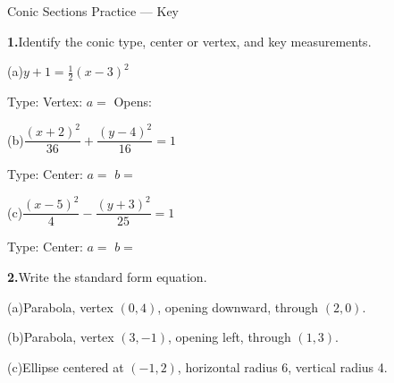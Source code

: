 \documentclass[10pt]{article}
\begin{document}
\namedateperiod

\vspace{0.10in}

\begin{notesbox}{Conic Sections Practice --- Key}

\textbf{1.}\quad Identify the conic type, center or vertex, and key measurements.

\vspace{4pt}
(a)\quad $y + 1 = \tfrac{1}{2}(x - 3)^2$

\vspace{4pt}
Type:  \quad Vertex:  \quad $a =$  \quad Opens: 

\vspace{10pt}
(b)\quad $\dfrac{(x+2)^2}{36} + \dfrac{(y-4)^2}{16} = 1$

\vspace{4pt}
Type:  \quad Center:  \quad $a =$  \quad $b =$ 

\vspace{10pt}
(c)\quad $\dfrac{(x-5)^2}{4} - \dfrac{(y+3)^2}{25} = 1$

\vspace{4pt}
Type:  \quad Center:  \quad $a =$  \quad $b =$ 

\vspace{10pt}
\textbf{2.}\quad Write the standard form equation.

\vspace{6pt}
(a)\quad Parabola, vertex $(0,4)$, opening downward, through $(2,0)$.

\vspace{4pt}

\vspace{10pt}
(b)\quad Parabola, vertex $(3,-1)$, opening left, through $(1,3)$.

\vspace{4pt}

\vspace{10pt}
(c)\quad Ellipse centered at $(-1,2)$, horizontal radius 6, vertical radius 4.

\vspace{4pt}


\end{notesbox}
\end{document}
